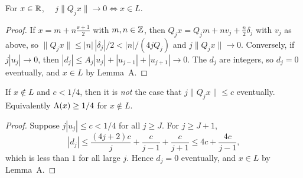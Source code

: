 \begin{theorem}\label{thm:class}
For $x\in\mathbb{R}$, $\quad j\|Q_jx\|\to0\iff x\in L.$
\end{theorem}

\begin{proof}
If $x=m+n\frac{\ee+1}{2}$ with $m,n\in\mathbb{Z}$, then
$Q_jx=Q_jm+nv_j+\tfrac n2\delta_j$ with $v_j$ as above, so
$\|Q_jx\|\le|n|\,|\delta_j|/2<|n|/(4jQ_j)$ and $j\|Q_jx\|\to0$.
Conversely, if $j|u_j|\to0$, then
$|d_j|\le A_j|u_j|+|u_{j-1}|+|u_{j+1}|\to0$. The $d_j$ are integers, so
$d_j=0$ eventually, and $x\in L$ by Lemma~A.
\end{proof}

\begin{theorem}\label{thm:gap}
If $x\notin L$ and $c<1/4$, then it is \emph{not} the case that
$j\|Q_jx\|\le c$ eventually. Equivalently $\Lambda(x)\ge1/4$ for $x\notin L$.
\end{theorem}

\begin{proof}
Suppose $j|u_j|\le c<1/4$ for all $j\ge J$. For $j\ge J+1$,
\[
 |d_j|\le\frac{(4j+2)c}{j}+\frac{c}{j-1}+\frac{c}{j+1}
 \le4c+\frac{4c}{j-1},
\]
which is less than $1$ for all large $j$. Hence $d_j=0$ eventually, and
$x\in L$ by Lemma~A.
\end{proof}

